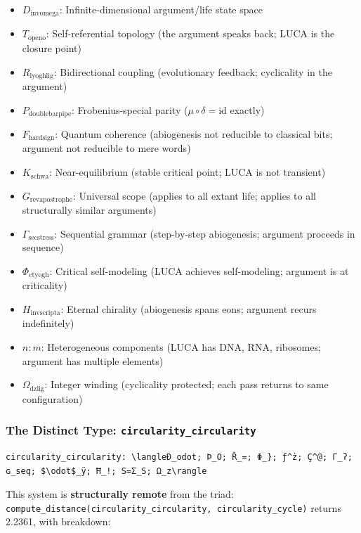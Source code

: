 \documentclass[12pt,a4paper]{article}
\begin{document}
\begin{itemize}
    \item $D_{\text{invomega}}$: Infinite-dimensional argument/life state space
    \item $T_{\text{openo}}$: Self-referential topology (the argument speaks back; LUCA is the closure point)
    \item $R_{\text{lyoghlig}}$: Bidirectional coupling (evolutionary feedback; cyclicality in the argument)
    \item $P_{\text{doublebarpipe}}$: Frobenius-special parity ($\mu \circ \delta = \text{id}$ exactly)
    \item $F_{\text{hardsign}}$: Quantum coherence (abiogenesis not reducible to classical bits; argument not reducible to mere words)
    \item $K_{\text{schwa}}$: Near-equilibrium (stable critical point; LUCA is not transient)
    \item $G_{\text{revapostrophe}}$: Universal scope (applies to all extant life; applies to all structurally similar arguments)
    \item $\Gamma_{\text{secstress}}$: Sequential grammar (step-by-step abiogenesis; argument proceeds in sequence)
    \item $\Phi_{\text{ctyogh}}$: Critical self-modeling (LUCA achieves self-modeling; argument is at criticality)
    \item $H_{\text{invscripta}}$: Eternal chirality (abiogenesis spans eons; argument recurs indefinitely)
    \item $n{:}m$: Heterogeneous components (LUCA has DNA, RNA, ribosomes; argument has multiple elements)
    \item $\Omega_{\text{dzlig}}$: Integer winding (cyclicality protected; each pass returns to same configuration)
\end{itemize}

\subsubsection{The Distinct Type: \texttt{circularity\_circularity}}

\begin{lstlisting}
circularity_circularity: \langleÐ_odot; Þ_O; Ř_=; Φ_}; ƒ^ż; Ç^@; Γ_ʔ; ɢ_seq; $\odot$_ÿ; Ħ_!; S=Σ_S; Ω_z\rangle
\end{lstlisting}

This system is \textbf{structurally remote} from the triad: \texttt{compute\_distance(circularity\_circularity, circularity\_cycle)} returns 2.2361, with breakdown:
\end{document}
